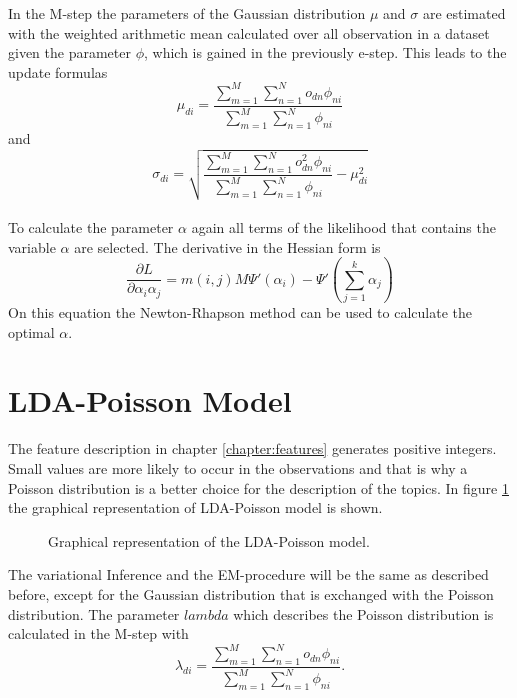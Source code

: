 In the M-step the parameters of the Gaussian distribution $\mu$ and $\sigma$ are estimated with the weighted arithmetic mean calculated over all observation in a dataset given the parameter $\phi$, which is gained in the previously e-step. This leads to the update formulas
\begin{equation}
 \mu_{di} = \frac{\sum_{m=1}^M \sum_{n=1}^N o_{dn} \phi_{ni} }{\sum_{m=1}^M \sum_{n=1}^N  \phi_{ni}}
\end{equation}
and
\begin{equation}
 \sigma_{di} = \sqrt{\frac{\sum_{m=1}^M \sum_{n=1}^N o_{dn}^2 \phi_{ni} }{\sum_{m=1}^M \sum_{n=1}^N  \phi_{ni}} - \mu_{di}^2}
\end{equation}\\

To calculate the parameter $\alpha$ again all terms of the likelihood that contains the variable $\alpha$ are selected. The derivative in the Hessian form is
\begin{equation}
 \frac{\partial L}{\partial \alpha_i\alpha_j} =  m(i,j) M \Psi'(\alpha_i) - \Psi'(\sum_{j=1}^k \alpha_j)
\end{equation}
On this equation the Newton-Rhapson method can be used to calculate the optimal $\alpha$.

\section{LDA-Poisson Model}

The feature description in chapter \ref{chapter:features} generates positive integers. Small values are more likely to occur in the observations and that is why a Poisson distribution is a better choice for the description of the topics. In figure \ref{fig:LDAPoisson} the graphical representation of LDA-Poisson model is shown. 

\begin{figure}[h!]
\centering
\def\svgwidth{0.8\textwidth}

\caption{Graphical representation of the LDA-Poisson model.}
\label{fig:LDAPoisson}
\end{figure}

The variational Inference and the EM-procedure will be the same as described before, except for the Gaussian distribution that is exchanged with the Poisson distribution. The parameter $lambda$ which describes the Poisson distribution is calculated in the M-step with
\begin{equation}
 \lambda_{di} = \frac{\sum_{m=1}^M \sum_{n=1}^N o_{dn} \phi_{ni} }{\sum_{m=1}^M \sum_{n=1}^N  \phi_{ni}}.
\end{equation}



